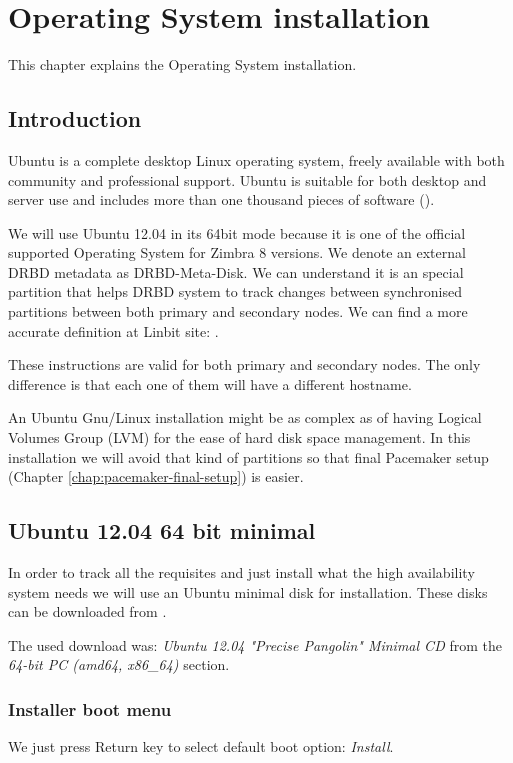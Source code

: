 

\chapter{Operating System installation}
\label{chap:operating-system-installation}
This chapter explains the Operating System installation.

\section {Introduction}
Ubuntu is a complete desktop Linux operating system, freely available with both community and professional support. Ubuntu is suitable for both desktop and server use and includes more than one thousand pieces of software (\cite{UbuntuWhatIs}).

We will use Ubuntu 12.04 in its 64bit mode because it is one of the official supported Operating System for Zimbra 8 versions. We denote an external DRBD metadata as DRBD-Meta-Disk. We can understand it is an special partition that helps DRBD system to track changes between synchronised partitions between both primary and secondary nodes. We can find a more accurate definition at Linbit site: \cite{LinbitDRBDInternals}.

These instructions are valid for both primary and secondary nodes. The only difference is that each one of them will have a different hostname.

An Ubuntu Gnu/Linux installation might be as complex as of having Logical Volumes Group (LVM) for the ease of hard disk space management. In this installation we will avoid that kind of partitions so that final Pacemaker setup (Chapter \ref{chap:pacemaker-final-setup}) is easier.

\section {Ubuntu 12.04 64 bit minimal}
In order to track all the requisites and just install what the high availability system needs we will use an Ubuntu minimal disk for installation. These disks can be downloaded from \cite{UbuntuMinimalDisk}.

The used download was: \textit{Ubuntu 12.04 "Precise Pangolin" Minimal CD} from the \textit{64-bit PC (amd64, x86\_64)} section. 

\subsection {Installer boot menu}
We just press Return key to select default boot option: \textit{Install}.
